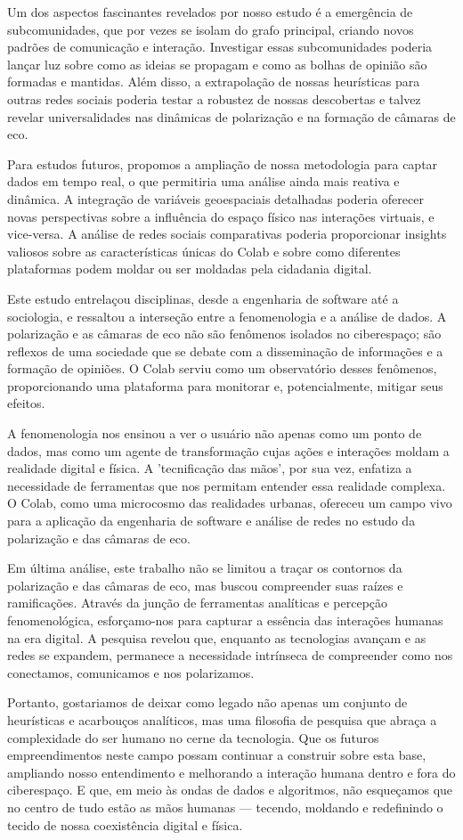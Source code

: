 Um dos aspectos fascinantes revelados por nosso estudo é a emergência de subcomunidades, que por vezes se isolam do grafo principal, criando novos padrões de comunicação e interação. Investigar essas subcomunidades poderia lançar luz sobre como as ideias se propagam e como as bolhas de opinião são formadas e mantidas. Além disso, a extrapolação de nossas heurísticas para outras redes sociais poderia testar a robustez de nossas descobertas e talvez revelar universalidades nas dinâmicas de polarização e na formação de câmaras de eco.

Para estudos futuros, propomos a ampliação de nossa metodologia para captar dados em tempo real, o que permitiria uma análise ainda mais reativa e dinâmica. A integração de variáveis geoespaciais detalhadas poderia oferecer novas perspectivas sobre a influência do espaço físico nas interações virtuais, e vice-versa. A análise de redes sociais comparativas poderia proporcionar insights valiosos sobre as características únicas do Colab e sobre como diferentes plataformas podem moldar ou ser moldadas pela cidadania digital.

Este estudo entrelaçou disciplinas, desde a engenharia de software até a sociologia, e ressaltou a interseção entre a fenomenologia e a análise de dados. A polarização e as câmaras de eco não são fenômenos isolados no ciberespaço; são reflexos de uma sociedade que se debate com a disseminação de informações e a formação de opiniões. O Colab serviu como um observatório desses fenômenos, proporcionando uma plataforma para monitorar e, potencialmente, mitigar seus efeitos.

A fenomenologia nos ensinou a ver o usuário não apenas como um ponto de dados, mas como um agente de transformação cujas ações e interações moldam a realidade digital e física. A 'tecnificação das mãos', por sua vez, enfatiza a necessidade de ferramentas que nos permitam entender essa realidade complexa. O Colab, como uma microcosmo das realidades urbanas, ofereceu um campo vivo para a aplicação da engenharia de software e análise de redes no estudo da polarização e das câmaras de eco.

Em última análise, este trabalho não se limitou a traçar os contornos da polarização e das câmaras de eco, mas buscou compreender suas raízes e ramificações. Através da junção de ferramentas analíticas e percepção fenomenológica, esforçamo-nos para capturar a essência das interações humanas na era digital. A pesquisa revelou que, enquanto as tecnologias avançam e as redes se expandem, permanece a necessidade intrínseca de compreender como nos conectamos, comunicamos e nos polarizamos.

Portanto, gostariamos de deixar como legado não apenas um conjunto de heurísticas e acarbouços analíticos, mas uma filosofia de pesquisa que abraça a complexidade do ser humano no cerne da tecnologia. Que os futuros empreendimentos neste campo possam continuar a construir sobre esta base, ampliando nosso entendimento e melhorando a interação humana dentro e fora do ciberespaço. E que, em meio às ondas de dados e algoritmos, não esqueçamos que no centro de tudo estão as mãos humanas — tecendo, moldando e redefinindo o tecido de nossa coexistência digital e física.